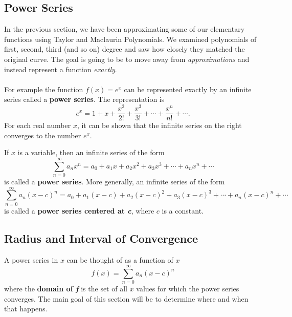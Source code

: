 \documentclass[addpoints, 12pt]{exam}
\begin{document}
\newpage
{}
\subsection*{Power Series}
In the previous section, we have been approximating some of our elementary functions using Taylor and Maclaurin Polynomials. We examined polynomials of first, second, third (and so on) degree and saw how closely they matched the original curve. The goal is going to be to move away from \textit{approximations} and instead represent a function \textit{exactly}.\\
\\
For example the function $f(x)=e^x$ can be represented exactly by an infinite series called a \textbf{power series}. The representation is
\[e^x=1+x+\frac{x^2}{2!}+\frac{x^3}{3!}+\cdots+\frac{x^n}{n!}+\cdots.\]
For each real number $x$, it can be shown that the infinite series on the right converges to the number $e^x$.\\


\begin{tcolorbox}[title= DEFINITIONS OF POWER SERIES,black,sharp corners,colback=white,colbacktitle=white,coltitle=black]

    If $x$ is a variable, then an infinite series of the form
    \[\sum_{n=0}^{\infty}a_n x^n=a_0 + a_1 x+a_2 x^2+a_3 x^3+\cdots+a_n x^n+\cdots\]
    is called a \textbf{power series}. More generally, an infinite series of the form
    \[\sum_{n=0}^{\infty}a_n (x-c)^n=a_0 + a_1 (x-c)+a_2 (x-c)^2+a_3 (x-c)^3+\cdots+a_n (x-c)^n+\cdots\]
    is called a \textbf{power series centered at \textit{c}}, where $c$ is a constant.

\end{tcolorbox}
\vspace{.1in}

\subsection*{Radius and Interval of Convergence}
A power series in $x$ can be thought of as a function of $x$
\[f(x)=\sum_{n=0}^{\infty}a_n (x-c)^n\]
where the \textbf{domain of \textit{f}} is the set of all $x$ values for which the power series converges. The main goal of this section will be to determine where and when that happens.
\end{document}
